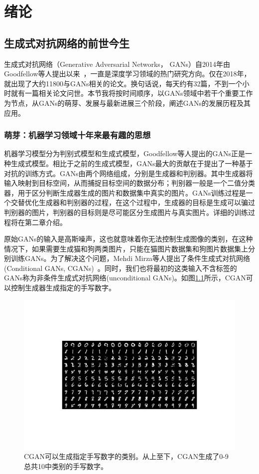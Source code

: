\chapter{绪论}

\section{生成式对抗网络的前世今生}

生成式对抗网络（Generative Adversarial Networks， GANs）自2014年由Goodfellow等人提出以来~\cite{GANs}，一直是深度学习领域的热门研究方向。仅在2018年，就出现了大约11800与GANs相关的论文。换句话说，每天约有32篇，不到一个小时就有一篇相关论文问世\cite{review}。本节我将按时间顺序，以GANs领域中若干个重要工作为节点，从GANs的萌芽、发展与最新进展三个阶段，阐述GANs的发展历程及其应用。

\subsection{萌芽：机器学习领域十年来最有趣的思想}
机器学习模型分为判别式模型和生成式模型，Goodfellow等人提出的GANs正是一种生成式模型。相比于之前的生成式模型，GANs最大的贡献在于提出了一种基于对抗的训练方式。GANs由两个网络组成，分别是生成器和判别器。其中生成器将输入映射到目标空间，从而捕捉目标空间的数据分布；判别器一般是一个二值分类器，用于区分判断生成器生成的图片和数据集中真实的图片。GANs训练过程是一个交替优化生成器和判别器的过程，在这个过程中，生成器的目标是生成可以骗过判别器的图片，判别器的目标则是尽可能区分生成图片与真实图片。详细的训练过程将在第二章介绍。

原始GANs的输入是高斯噪声，这也就意味着你无法控制生成图像的类别，在这种情况下，如果需要生成猫和狗两类图片，只能在猫图片数据集和狗图片数据集上分别训练GANs。为了解决这个问题，Mehdi Mirza等人提出了条件生成式对抗网络(Conditional GANs, CGANs)~\cite{CGANs}。同时，我们也将最初的这类输入不含标签的GANs称为非条件生成式对抗网络(unconditional GANs)。如图\ref{CGAN-result}所示，CGAN可以控制生成器生成指定的手写数字。

\begin{figure}
    \centering
    \includegraphics[width=\textwidth]{figures/CGAN-result.pdf}
    \caption{CGAN可以生成指定手写数字的类别。从上至下，CGAN生成了0-9总共10中类别的手写数字。}
    \label{CGAN-result}
\end{figure}

